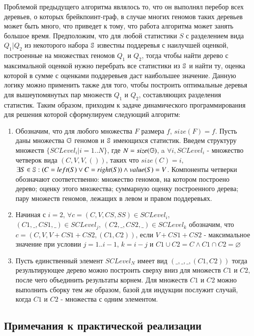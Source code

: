 Проблемой предыдущего алгоритма являлось то, что он выполнял перебор всех деревьев, о которых  брейкпоинт-граф,
в случае многих геномов таких деревьев может быть много, что приведет к тому, что работа алгоритма может занять большое время.
Предположим, что для любой статистики $S$ с разделением вида $Q_1|Q_2$ из некоторого набора $\mathbb{S}$ известны поддеревья с наилучшей оценкой,
построенные на множествах геномов $Q_1$ и $Q_2$, тогда чтобы найти дерево с максимальной оценкой нужно перебрать все статистики из $\mathbb{S}$ и найти ту,
оценка которой в сумме с оценками поддеревьев даст наибольшее значение.
Данную логику можно применить также для того, чтобы построить оптимальные деревья для вышеупомянутых пар множеств $Q_1$ и $Q_2$,
составляющих разделения статистик.
Таким образом, приходим к задаче динамического программирования для решения которой сформулируем следующий алгоритм:
\begin{enumerate}
  \item Обозначим, что для любого множества $F$ размера $f$, $size(F) = f$.
    Пусть даны множества $\mathbb{G}$ геномов и $\mathbb{S}$ имеющихся статистик.
    Введем структуру множеств $\{ SCLevel_i | i = 1..N \}$, где $N = size(\mathbb{G})$,
    a $\forall i, SCLevel_i$ - множество четверок вида $(C, V, V, ())$, таких что $size(C) = i$,
    $\exists S \in \mathbb{S}: (C = left(S) \lor C = right(S)) \land value(S) = V$.
    Компоненты четверки обозначают соответственно: множество геномов, на котором построено дерево;
    оценку этого множества; суммарную оценку построенного дерева; пару множеств геномов, лежащих в левом и правом поддеревьях.
  \item Начиная с $i = 2$,
    $\forall c = (C, V, CS, SS) \in SCLevel_i$,
    $(C1, \_, CS1, \_) \in SCLevel_j$,
    $(C2, \_, CS2, \_) \in SCLevel_k$ обозначим, что $c = (C, V, V + CS1 + CS2, (C1, C2))$,
    если $V + CS1 + CS2$ - максимальное значение при условии  $j = 1..i-1$, $k = i - j$ и $C1 \cup C2 = C \land C1 \cap C2 = \varnothing$
  \item Пусть единственный элемент $SCLevel_N$ имеет вид $(\_, \_, \_, (C1, C2))$ тогда результирующее дерево можно построить сверху
    вниз для множеств $C1$ и $C2$, после чего объединить результаты корнем.
    Для множеств $C1$ и $C2$ можно выполнить сборку тем же образом, базой для индукции послужит случай,
    когда $C1$ и $C2$ - множества с одним элементом.
\end{enumerate}

\subsection{Примечания к практической реализации}

